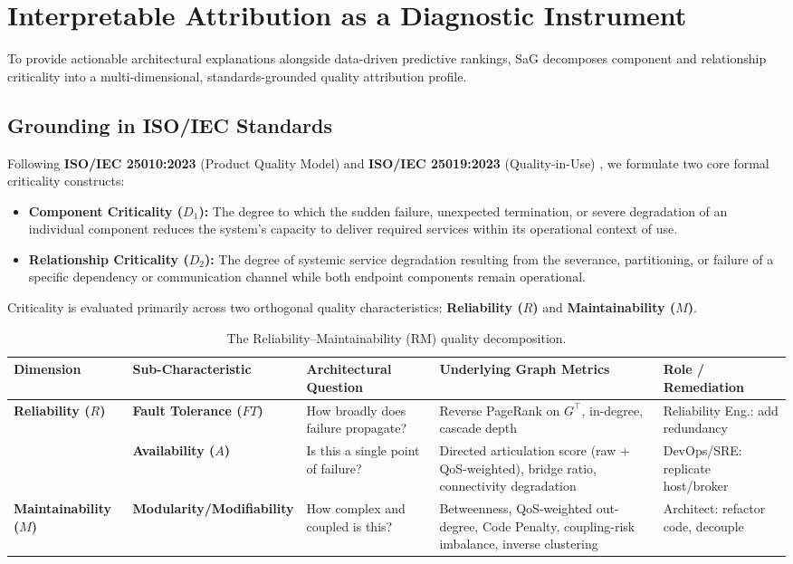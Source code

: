 \section{Interpretable Attribution as a Diagnostic Instrument}
\label{sec:4}

To provide actionable architectural explanations alongside data-driven predictive rankings, SaG decomposes component and relationship criticality into a multi-dimensional, standards-grounded quality attribution profile.

\subsection{Grounding in ISO/IEC Standards}
\label{sec:4.1}

Following \textbf{ISO/IEC 25010:2023} (Product Quality Model) \cite{iso25010_2023} and \textbf{ISO/IEC 25019:2023} (Quality-in-Use) \cite{iso25019_2023}, we formulate two core formal criticality constructs:
\begin{itemize}
    \item \textbf{Component Criticality ($D_1$):} The degree to which the sudden failure, unexpected termination, or severe degradation of an individual component reduces the system's capacity to deliver required services within its operational context of use.
    \item \textbf{Relationship Criticality ($D_2$):} The degree of systemic service degradation resulting from the severance, partitioning, or failure of a specific dependency or communication channel while both endpoint components remain operational.
\end{itemize}

Criticality is evaluated primarily across two orthogonal quality characteristics: \textbf{Reliability ($R$)} and \textbf{Maintainability ($M$)}.

\begin{table}[htbp]
\centering
\small
\caption{The Reliability--Maintainability (RM) quality decomposition.}
\label{tab:3}
\begin{tabular}{lllll}
\toprule
\textbf{Dimension} & \textbf{Sub-Characteristic} & \textbf{Architectural Question} & \textbf{Underlying Graph Metrics} & \textbf{Role / Remediation} \\
\midrule
\textbf{Reliability ($R$)} & \textbf{Fault Tolerance ($FT$)} & How broadly does failure propagate? & Reverse PageRank on $G^\top$, in-degree, cascade depth & Reliability Eng.: add redundancy \\
& \textbf{Availability ($A$)} & Is this a single point of failure? & Directed articulation score (raw + QoS-weighted), bridge ratio, connectivity degradation & DevOps/SRE: replicate host/broker \\
\textbf{Maintainability ($M$)} & \textbf{Modularity/Modifiability} & How complex and coupled is this? & Betweenness, QoS-weighted out-degree, Code Penalty, coupling-risk imbalance, inverse clustering & Architect: refactor code, decouple \\
\bottomrule
\end{tabular}
\end{table}

